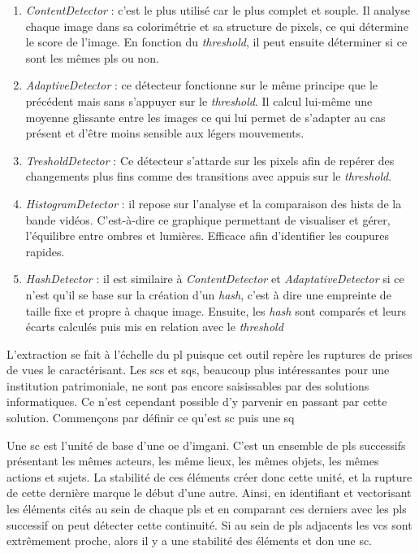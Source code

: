 \begin{enumerate}
	\item \textit{ContentDetector} : c'est le plus utilisé car le plus complet et souple. Il analyse chaque image dans sa colorimétrie et sa structure de pixels, ce qui détermine le score de l'image. En fonction du \textit{threshold}, il peut ensuite déterminer si ce sont les mêmes \glspl{pl} ou non.
	\item \textit{AdaptiveDetector} : ce détecteur fonctionne sur le même principe que le précédent mais sans s'appuyer sur le \textit{threshold}. Il calcul lui-même une moyenne glissante entre les images ce qui lui permet de s'adapter au cas présent et d'être moins sensible aux légers mouvements. 
	\item \textit{TresholdDetector} : Ce détecteur s'attarde sur les pixels afin de repérer des changements plus fins comme des transitions avec appuis sur le \textit{threshold}.  
	\item \textit{HistogramDetector} : il repose sur l'analyse et la comparaison des \glspl{hist} de la bande vidéos. C'est-à-dire ce graphique permettant de visualiser et gérer, l'équilibre entre ombres et lumières. Efficace afin d'identifier les coupures rapides. 
	\item \textit{HashDetector }: il est similaire à \textit{ContentDetector} et \textit{AdaptativeDetector} si ce n'est qu'il se base sur la création d'un \textit{hash}, c'est à dire une empreinte de taille fixe et propre à chaque image. Ensuite, les \textit{hash} sont comparés et leurs écarts calculés puis mis en relation avec le \textit{threshold}\newline
\end{enumerate}

L'extraction se fait à l'échelle du \gls{pl} puisque cet outil repère les ruptures de prises de vues le caractérisant. Les \glspl{sc} et \glspl{sq}, beaucoup plus intéressantes pour une institution patrimoniale, ne sont pas encore saisissables par des solutions informatiques. Ce n'est cependant possible d'y parvenir en passant par cette solution. Commençons par définir ce qu'est \gls{sc} puis une \gls{sq}

Une \gls{sc} est l'unité de base d'une \gls{oe} d'\gls{imgani}. C'est un ensemble de \glspl{pl} successifs présentant les mêmes acteurs, les même lieux, les mêmes objets, les mêmes actions et sujets. La stabilité de ces éléments créer donc cette unité, et la rupture de cette dernière marque le début d'une autre. Ainsi, en identifiant et vectorisant les éléments cités au sein de chaque \glspl{pl} et en comparant ces derniers avec les \glspl{pl} successif on peut détecter cette continuité. Si au sein de \glspl{pl} adjacents les \gls{vcs} sont extrêmement proche, alors il y a une stabilité des éléments et don une \gls{sc}.

